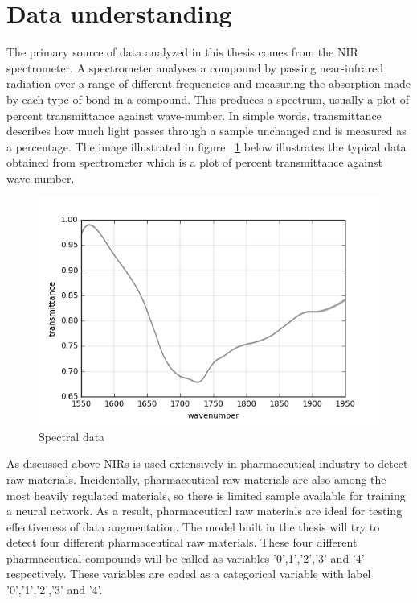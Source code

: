 \section{Data understanding}
The primary source of data analyzed in this thesis comes from the NIR spectrometer. A spectrometer analyses a compound by passing near-infrared radiation over a range of different frequencies and measuring the absorption made by each type of bond in a compound. This produces a spectrum, usually a plot of percent transmittance against wave-number. In simple words, transmittance describes how much light passes through a sample unchanged and is measured as a percentage. The image illustrated in figure ~\ref{fig:Spectral data} below illustrates the typical data obtained from spectrometer which is a plot of percent transmittance against wave-number.

\begin{figure}[ht]
	\begin{center}
		\includegraphics[width=\textwidth]{images/spectral_graph.png}
		\caption{Spectral data}
		\label{fig:Spectral data}
	\end{center}
\end{figure}


As discussed above NIRs is used extensively in pharmaceutical industry to detect raw materials. Incidentally, pharmaceutical raw materials are also among the most heavily regulated materials, so there is limited sample available for training a neural network. As a result, pharmaceutical raw materials are ideal for testing effectiveness of data augmentation. The model built in the thesis will try to detect four different pharmaceutical raw materials. These four different pharmaceutical compounds will be called as variables '0',1','2','3' and '4' respectively. These variables are coded as a categorical variable with label '0','1','2','3' and '4'.

